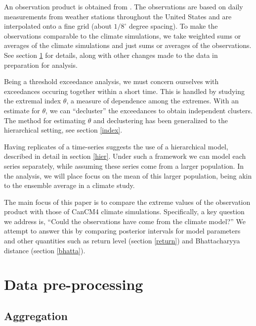 \documentclass[12pt]{article}
\begin{document}
An observation product is obtained from \cite{maurer2002long}. The observations are based on daily measurements from weather stations throughout the United States and are interpolated onto a fine grid (about $1/8^\circ$ degree spacing). To make the observations comparable to the climate simulations, we take weighted sums or averages of the climate simulations and just sums or averages of the observations. See section \ref{process} for details, along with other changes made to the data in preparation for analysis.

Being a threshold exceedance analysis, we must concern ourselves with exceedances occuring together within a short time. This is handled by studying the extremal index $\theta$, a measure of dependence among the extremes. With an estimate for $\theta$, we can ``decluster'' the exceedances to obtain independent clusters. The method for estimating $\theta$ and declustering has been generalized to the hierarchical setting, see section \ref{index}.

Having replicates of a time-series suggests the use of a hierarchical model, described in detail in section \ref{hier}. Under such a framework we can model each series separately, while assuming these series come from a larger population. In the analysis, we will place focus on the mean of this larger population, being akin to the ensemble average in a climate study.

The main focus of this paper is to compare the extreme values of the observation product with those of CanCM4 climate simulations. Specifically, a key question we address is, ``Could the observations have come from the climate model?'' We attempt to answer this by comparing posterior intervals for model parameters and other quantities such as return level (section \ref{return}) and Bhattacharyya distance (section \ref{bhatta}).



\section{Data pre-processing}
\label{process}

\subsection{Aggregation}
\label{aggregate}
\end{document}
